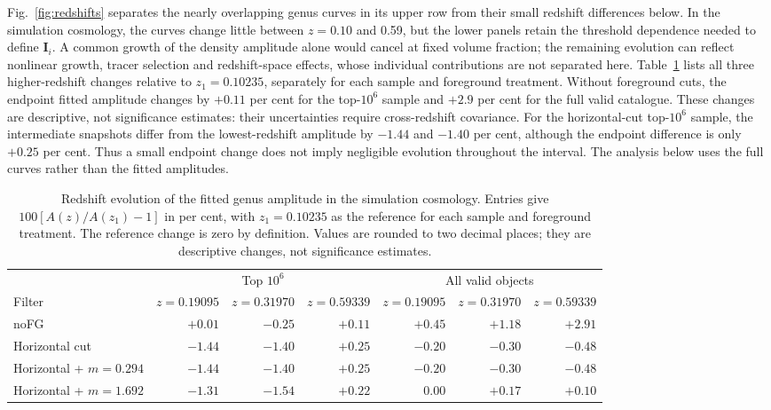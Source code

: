Fig.~\ref{fig:redshifts} separates the nearly overlapping genus curves in its upper row from their small redshift differences below. In the simulation cosmology, the curves change little between $z=0.10$ and 0.59, but the lower panels retain the threshold dependence needed to define $\boldsymbol I_i$. A common growth of the density amplitude alone would cancel at fixed volume fraction; the remaining evolution can reflect nonlinear growth, tracer selection and redshift-space effects, whose individual contributions are not separated here. Table~\ref{tab:amplitudes} lists all three higher-redshift changes relative to $z_1=0.10235$, separately for each sample and foreground treatment. Without foreground cuts, the endpoint fitted amplitude changes by $+0.11$ per cent for the top-$10^6$ sample and $+2.9$ per cent for the full valid catalogue. These changes are descriptive, not significance estimates: their uncertainties require cross-redshift covariance. For the horizontal-cut top-$10^6$ sample, the intermediate snapshots differ from the lowest-redshift amplitude by $-1.44$ and $-1.40$ per cent, although the endpoint difference is only $+0.25$ per cent. Thus a small endpoint change does not imply negligible evolution throughout the interval. The analysis below uses the full curves rather than the fitted amplitudes.

\begin{table}
\centering
\caption{Redshift evolution of the fitted genus amplitude in the simulation cosmology. Entries give $100[A(z)/A(z_1)-1]$ in per cent, with $z_1=0.10235$ as the reference for each sample and foreground treatment. The reference change is zero by definition. Values are rounded to two decimal places; they are descriptive changes, not significance estimates.}
\label{tab:amplitudes}
\begin{tabular}{@{}lrrrrrr@{}}
\toprule
& \multicolumn{3}{c}{Top $10^6$} & \multicolumn{3}{c}{All valid objects} \\
\cmidrule(lr){2-4}\cmidrule(l){5-7}
Filter & $z=0.19095$ & $z=0.31970$ & $z=0.59339$ & $z=0.19095$ & $z=0.31970$ & $z=0.59339$ \\
\midrule
noFG & $+0.01$ & $-0.25$ & $+0.11$ & $+0.45$ & $+1.18$ & $+2.91$ \\
Horizontal cut & $-1.44$ & $-1.40$ & $+0.25$ & $-0.20$ & $-0.30$ & $-0.48$ \\
Horizontal + $m=0.294$ & $-1.44$ & $-1.40$ & $+0.25$ & $-0.20$ & $-0.30$ & $-0.48$ \\
Horizontal + $m=1.692$ & $-1.31$ & $-1.54$ & $+0.22$ & $0.00$ & $+0.17$ & $+0.10$ \\
\bottomrule
\end{tabular}
\end{table}



